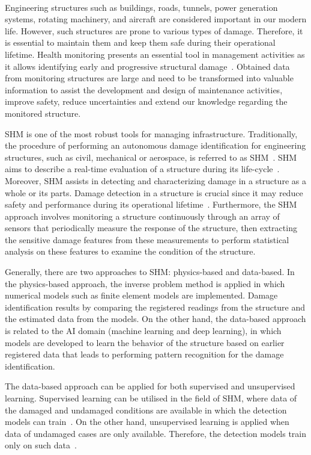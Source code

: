 \paragraph{}
Engineering structures such as buildings, roads, tunnels, power generation systems, rotating machinery, and aircraft are considered important in our modern life.
However, such structures are prone to various types of damage.
Therefore, it is essential to maintain them and keep them safe during their operational lifetime.
Health monitoring presents an essential tool in management activities as it allows identifying early and progressive structural damage~\cite{Farrar2007}. 
Obtained data from monitoring structures are large and need to be transformed into valuable information to assist the development and design of maintenance activities, improve safety, reduce uncertainties and extend our knowledge regarding the monitored structure.

SHM is one of the most robust tools for managing infrastructure.
Traditionally, the procedure of performing an autonomous damage identification for engineering structures, such as civil, mechanical or aerospace, is referred to as SHM~\cite{farrar2001vibration}.
SHM aims to describe a real-time evaluation of a structure during its life-cycle~\cite{Balageas2010}. 
Moreover, SHM assists in detecting and characterizing damage in a structure as a whole or its parts. 
Damage detection in a structure is crucial since it may reduce safety and performance during its operational lifetime~\cite{Yuan2016}.
Furthermore, the SHM approach involves monitoring a structure continuously through an array of sensors that periodically measure the response of the structure, then extracting the sensitive damage features from these measurements to perform statistical analysis on these features to examine the condition of the structure.

Generally, there are two approaches to SHM: physics-based and
data-based.
In the physics-based approach, the inverse problem method is applied in which numerical models such as finite element models are implemented. 
Damage identification results by comparing the registered readings from the structure and the estimated data from the models.
On the other hand, the data-based approach is related to the AI domain (machine learning and deep learning), in which models are developed to learn the behavior of the structure based on earlier registered data that leads to performing pattern recognition for the damage identification.

The data-based approach can be applied for both supervised and unsupervised learning\cite{worden2007application}.
Supervised learning can be utilised in the field of SHM, where data of the damaged and undamaged conditions are available in which the detection models can train~\cite{figueiredo2018machine}.
On the other hand, unsupervised learning is applied when data of undamaged cases are only available.
Therefore, the detection models train only on such data~\cite{figueiredo2018machine}.

